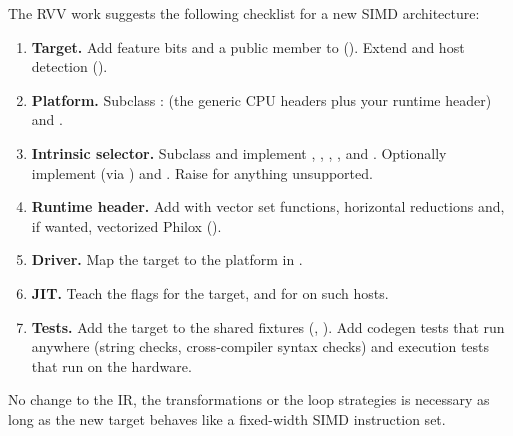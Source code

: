The RVV work suggests the following checklist for a new SIMD architecture:
\begin{enumerate}
  \item \textbf{Target.} Add feature bits and a public member to 
        (). Extend  and host
        detection ().
  \item \textbf{Platform.} Subclass : 
        (the generic CPU headers plus your runtime header) and
        .
  \item \textbf{Intrinsic selector.} Subclass  and implement
        , , ,
        ,  and . Optionally
        implement  (via )
        and . Raise  for anything
        unsupported.
  \item \textbf{Runtime header.} Add  with
        vector set functions, horizontal reductions and, if wanted, vectorized Philox
        ().
  \item \textbf{Driver.} Map the target to the platform in
        .
  \item \textbf{JIT.} Teach  the  flags for the
        target, and for  on such hosts.
  \item \textbf{Tests.} Add the target to the shared fixtures
        (, ). Add codegen tests that
        run anywhere (string checks, cross-compiler syntax checks) and execution tests
        that run on the hardware.
\end{enumerate}
No change to the IR, the transformations or the loop strategies is necessary as long
as the new target behaves like a fixed-width SIMD instruction set.

